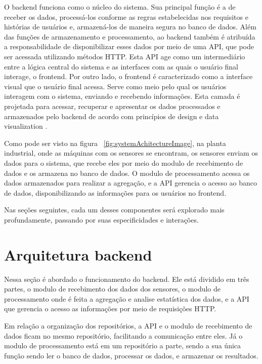 O backend funciona como o núcleo do sistema. Sua principal função é a de receber os dados, processá-los conforme as regras estabelecidas nos requisitos e histórias de usuários e, armazená-los de maneira segura no banco de dados. Além das funções de armazenamento e processamento, ao backend também é atribuída a responsabilidade de disponibilizar esses dados por meio de uma \gls{API}, que pode ser acessada utilizando métodos \gls{HTTP}. Esta \gls{API} age como um intermediário entre a lógica central do sistema e as interfaces com as quais o usuário final interage, o frontend.
Por outro lado, o frontend é caracterizado como a interface visual que o usuário final acessa. Serve como meio pelo qual os usuários interagem com o sistema, enviando e recebendo informações. Esta camada é projetada para acessar, recuperar e apresentar os dados processados e armazenados pelo backend de acordo com princípios de design e data visualization \cite{barbosa2019introduction}.

Como pode ser visto na figura ~\ref{fig:systemAchitectureImage}, na planta industrial, onde as máquinas com os sensores se encontram, os sensores enviam os dados para o sistema, que recebe eles por meio do modulo de recebimento de dados e os armazena no banco de dados. O modulo de processamento acessa os dados armazenados para realizar a agregação, e a \gls{API} gerencia o acesso ao banco de dados, disponibilizando as informações para os usuários no frontend.

Nas seções seguintes, cada um desses componentes será explorado mais profundamente, passando por suas especificidades e interações.


\section[Arquitetura do backend]{Arquitetura backend}
Nessa seção é abordado o funcionamento do backend. Ele está dividido em três partes, o modulo de recebimento dos dados dos sensores, o modulo de processamento onde é feita a agregação e analise estatística dos dados, e a \gls{API} que gerencia o acesso as informações por meio de requisições \gls{HTTP}.

Em relação a organização dos repositórios, a \gls{API} e o modulo de recebimento de dados ficam no mesmo repositório, facilitando a comunicação entre eles. Já o modulo de processamento está em um repositório a parte, sendo a sua única função sendo ler o banco de dados, processar os dados, e armazenar os resultados.

